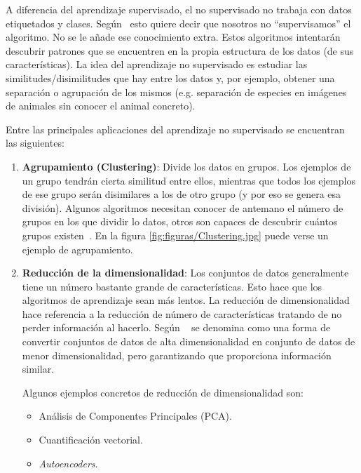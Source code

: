 A diferencia del aprendizaje supervisado, el no supervisado no trabaja con datos etiquetados y clases. Según~\cite{salim:usl} esto quiere decir que nosotros no ``supervisamos'' el algoritmo. No se le añade ese conocimiento extra. Estos algoritmos intentarán descubrir patrones que se encuentren en la propia estructura de los datos (de sus características). La idea del aprendizaje no supervisado es estudiar las similitudes/disimilitudes que hay entre los datos y, por ejemplo, obtener una separación o agrupación de los mismos (e.g. separación de especies en imágenes de animales sin conocer el animal concreto).
 
Entre las principales aplicaciones del aprendizaje no supervisado se encuentran las siguientes:
\vspace{-4px}
\begin{enumerate}
    \item \textbf{Agrupamiento (Clustering)}: Divide los datos en grupos. Los ejemplos de un grupo tendrán cierta similitud entre ellos, mientras que todos los ejemplos de ese grupo serán disimilares a los de otro grupo (y por eso se genera esa división). Algunos algoritmos necesitan conocer de antemano el número de grupos en los que dividir lo datos, otros son capaces de descubrir cuántos grupos existen~\cite{salim:usl}. En la figura \ref{fig:figuras/Clustering.jpg} puede verse un ejemplo de agrupamiento.
    \item \textbf{Reducción de la dimensionalidad}: Los conjuntos de datos generalmente tiene un número bastante grande de características. Esto hace que los algoritmos de aprendizaje sean más lentos. La reducción de dimensionalidad hace referencia a la reducción de número de características tratando de no perder información al hacerlo.
    Según ~\cite{javatpoint:reduccionsdims} se denomina como una forma de convertir conjuntos de datos de alta dimensionalidad en conjunto de datos de menor dimensionalidad, pero garantizando que proporciona información similar.
    
    Algunos ejemplos concretos de reducción de dimensionalidad son:
    \begin{itemize}
        \item Análisis de Componentes Principales (PCA).
        \item Cuantificación vectorial.
        \item \textit{Autoencoders}.
    \end{itemize}
\end{enumerate}

